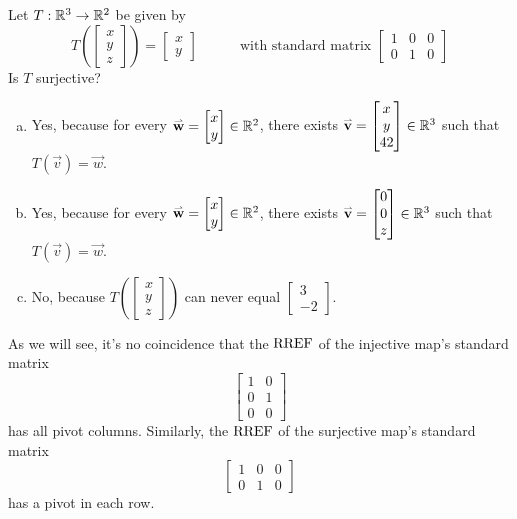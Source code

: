 \begin{activity}{2}
Let \(T: \mathbb{R}^3 \rightarrow \mathbb{R}^2\) be given by
\[
  T\left(\begin{bmatrix}x \\ y\\z \end{bmatrix} \right)
    =
  \begin{bmatrix} x \\ y \end{bmatrix}
    \hspace{3em}
    \text{with standard matrix }
  \begin{bmatrix} 1 & 0 & 0 \\ 0 & 1 & 0 \end{bmatrix}
\]
Is \(T\) surjective?
\begin{enumerate}[a)]
\item Yes, because for every \(\mathbf{\accentset{\rightharpoonup}{w}}=\begin{bmatrix}x\\y\end{bmatrix}\in\mathbb{R}^2\),
there exists \(\mathbf{\accentset{\rightharpoonup}{v}}=\begin{bmatrix}x\\y\\42\end{bmatrix}\in\mathbb{R}^3\) such that
\(T(\vec v)=\vec w\).
\item Yes, because for every \(\mathbf{\accentset{\rightharpoonup}{w}}=\begin{bmatrix}x\\y\end{bmatrix}\in\mathbb{R}^2\),
there exists \(\mathbf{\accentset{\rightharpoonup}{v}}=\begin{bmatrix}0\\0\\z\end{bmatrix}\in\mathbb{R}^3\) such that
\(T(\vec v)=\vec w\).
\item No, because 
  \(
    T\left(\begin{bmatrix}x\\y\\z\end{bmatrix}\right)
  \)
can never equal
  \(
  \begin{bmatrix} 3\\-2 \end{bmatrix}
  \).
\end{enumerate}
\end{activity}

\begin{observation}
As we will see, it's no coincidence that the \(\operatorname{RREF}\) of the
injective map's standard matrix
\[
  \begin{bmatrix} 1 & 0 \\ 0 & 1 \\ 0 & 0 \end{bmatrix}
\]
has all pivot columns. Similarly, the \(\operatorname{RREF}\) of the surjective map's
standard matrix
\[
  \begin{bmatrix} 1 & 0 & 0 \\ 0 & 1 & 0 \end{bmatrix}
\]
has a pivot in each row.
\end{observation}




